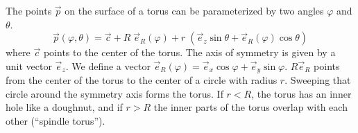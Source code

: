 \documentclass[twocolumn]{aastex631}
\begin{document}
The points $\vec p$ on the surface of a torus can be parameterized by two angles $\varphi$ and $\theta$.
\begin{equation}
\vec p(\varphi, \theta) = \vec c + R \; \vec e_R(\varphi) + r \; (\vec e_z \sin \theta + \vec e_R(\varphi) \cos \theta)
\end{equation}
where $\vec c$ points to the center of the torus. The axis of symmetry is given by a unit vector $\vec e_z$. We define a vector $\vec e_R(\varphi) = \vec e_x \cos\varphi + \vec e_y \sin\varphi$. $R \vec e_R$ points from the center of the torus to the center of a circle with radius $r$. Sweeping that circle around the symmetry axis forms the torus. If $r < R$, the torus has an inner hole like a doughnut, and if $r > R$ the inner parts of the torus overlap with each other (``spindle torus'').
\end{document}
